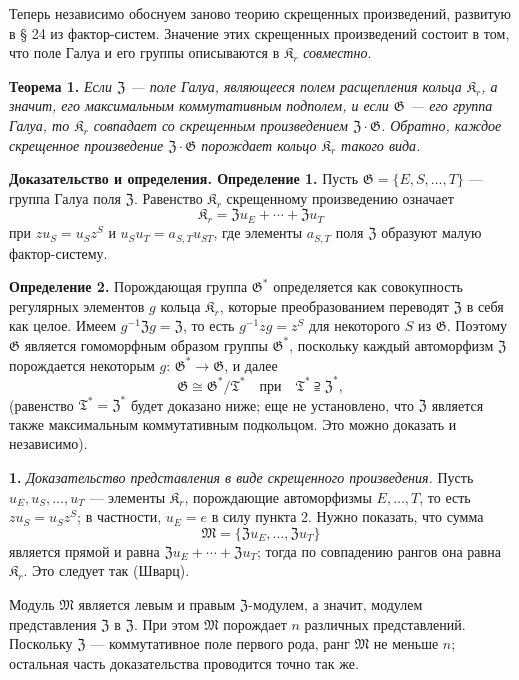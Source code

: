 \documentclass[11pt]{article}
\begin{document}
Теперь независимо обоснуем заново теорию скрещенных произведений, развитую в § 24 из фактор-систем. Значение этих скрещенных произведений состоит в том, что поле Галуа и его группы описываются в \(\mathfrak K_r\) \emph{совместно}.

\noindent\textbf{Теорема 1.} \emph{Если \(\mathfrak Z\) --- поле Галуа, являющееся полем расщепления кольца \(\mathfrak K_r\), а значит, его максимальным коммутативным подполем, и если \(\mathfrak G\) --- его группа Галуа, то \(\mathfrak K_r\) совпадает со скрещенным произведением \(\mathfrak Z\cdot\mathfrak G\). Обратно, каждое скрещенное произведение \(\mathfrak Z\cdot\mathfrak G\) порождает кольцо \(\mathfrak K_r\) такого вида.}

\noindent\textbf{Доказательство и определения. Определение 1.} Пусть \(\mathfrak G=\{E,S,\ldots,T\}\) --- группа Галуа поля \(\mathfrak Z\). Равенство \(\mathfrak K_r\) скрещенному произведению означает
\[
\mathfrak K_r=\mathfrak Zu_E+\cdots+\mathfrak Zu_T
\]
при \(zu_S=u_Sz^S\) и \(u_Su_T=a_{S,T}u_{ST}\), где элементы \(a_{S,T}\) поля \(\mathfrak Z\) образуют малую фактор-систему.

\noindent\textbf{Определение 2.} Порождающая группа \(\mathfrak G^*\) определяется как совокупность регулярных элементов \(g\) кольца \(\mathfrak K_r\), которые преобразованием переводят \(\mathfrak Z\) в себя как целое. Имеем \(g^{-1}\mathfrak Zg=\mathfrak Z\), то есть \(g^{-1}zg=z^S\) для некоторого \(S\) из \(\mathfrak G\). Поэтому \(\mathfrak G\) является гомоморфным образом группы \(\mathfrak G^*\), поскольку каждый автоморфизм \(\mathfrak Z\) порождается некоторым \(g\): \(\mathfrak G^*\to\mathfrak G\), и далее
\[
\mathfrak G\cong\mathfrak G^*/\mathfrak T^*
\quad\text{при}\quad
\mathfrak T^*\supseteqq\mathfrak Z^*,
\]
(равенство \(\mathfrak T^*=\mathfrak Z^*\) будет доказано ниже; еще не установлено, что \(\mathfrak Z\) является также максимальным коммутативным подкольцом. Это можно доказать и независимо).

\noindent\textbf{1.} \emph{Доказательство представления в виде скрещенного произведения.} Пусть \(u_E,u_S,\ldots,u_T\) --- элементы \(\mathfrak K_r\), порождающие автоморфизмы \(E,\ldots,T\), то есть \(zu_S=u_Sz^S\); в частности, \(u_E=e\) в силу пункта 2. Нужно показать, что сумма
\[
\mathfrak M=\{\mathfrak Zu_E,\ldots,\mathfrak Zu_T\}
\]
является прямой и равна \(\mathfrak Zu_E+\cdots+\mathfrak Zu_T\); тогда по совпадению рангов она равна \(\mathfrak K_r\). Это следует так (Шварц).

Модуль \(\mathfrak M\) является левым и правым \(\mathfrak Z\)-модулем, а значит, модулем представления \(\mathfrak Z\) в \(\mathfrak Z\). При этом \(\mathfrak M\) порождает \(n\) различных представлений. Поскольку \(\mathfrak Z\) --- коммутативное поле первого рода, ранг \(\mathfrak M\) не меньше \(n\); остальная часть доказательства проводится точно так же.
\end{document}
